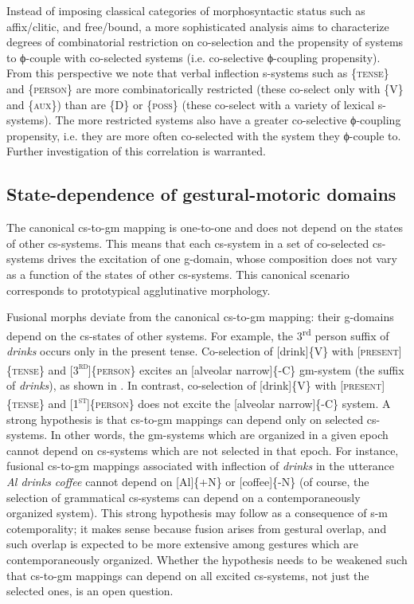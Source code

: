   Instead of imposing classical categories of morphosyntactic status such as affix/clitic, and free/bound, a more sophisticated analysis aims to characterize degrees of combinatorial restriction on co-selection and the propensity of systems to ϕ-couple with co-selected systems (i.e. co-selective ϕ-coupling propensity). From this perspective we note that verbal inflection s-systems such as \{\textsc{tense}\} and \{\textsc{person}\} are more combinatorically restricted (these co-select only with \{V\} and \{\textsc{aux}\}) than are \{D\} or \{\textsc{poss}\} (these co-select with a variety of lexical s-systems). The more restricted systems also have a greater co-selective ϕ-coupling propensity, i.e. they are more often co-selected with the system they ϕ-couple to. Further investigation of this correlation is warranted.

\subsection{State-dependence of gestural-motoric domains}

The canonical cs-to-gm mapping is one-to-one and does not depend on the states of other cs-systems. This means that each cs-system in a set of co-selected cs-systems drives the excitation of one g-domain, whose composition does not vary as a function of the states of other cs-systems. This canonical scenario corresponds to prototypical agglutinative morphology. 

  Fusional morphs deviate from the canonical cs-to-gm mapping: their g-domains depend on the cs-states of other systems. For example, the 3\textsuperscript{rd} person suffix of \textit{drinks} occurs only in the present tense. Co-selection of [drink]\{V\} with [\textsc{present}]\{\textsc{tense}\} and [\textsc{3}\textsc{\textsuperscript{rd}}]\{\textsc{person}\} excites an [alveolar narrow]\{-C\} gm-system (the suffix of \textit{drinks}), as shown in {}. In contrast, co-selection of [drink]\{V\} with [\textsc{present]}\{\textsc{tense}\} and [\textsc{1}\textsc{\textsuperscript{st}}]\{\textsc{person}\} does not excite the [alveolar narrow]\{-C\} system. A strong hypothesis is that cs-to-gm mappings can depend only on selected cs-systems. In other words, the gm-systems which are organized in a given epoch cannot depend on cs-systems which are not selected in that epoch. For instance, fusional cs-to-gm mappings associated with inflection of \textit{drinks} in the utterance \textit{Al drinks coffee} cannot depend on [Al]\{+N\} or [coffee]\{-N\} (of course, the selection of grammatical cs-systems can depend on a contemporaneously organized system). This strong hypothesis may follow as a consequence of s-m cotemporality; it makes sense because fusion arises from gestural overlap, and such overlap is expected to be more extensive among gestures which are contemporaneously organized. Whether the hypothesis needs to be weakened such that cs-to-gm mappings can depend on all excited cs-systems, not just the selected ones, is an open question.

